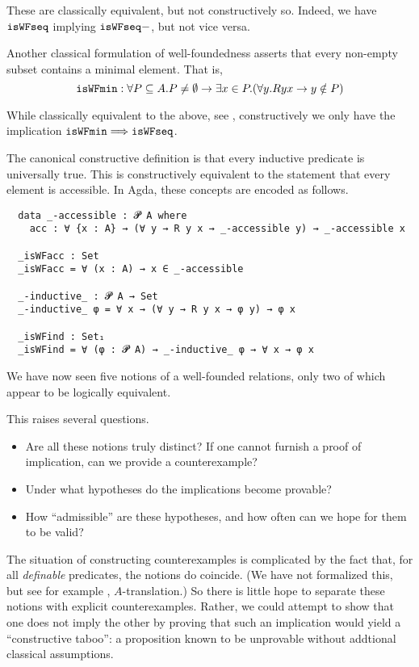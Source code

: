 These are classically equivalent, but not constructively so.
Indeed, we have $\mathtt{isWFseq}$ implying $\mathtt{isWFseq-}$, but not vice versa.

Another classical formulation of well-foundedness
asserts that every non-empty subset
contains a minimal element.  That is,
\[ \mathtt{isWFmin} : \forall P \subseteq A. P \neq \emptyset \to \exists x \in P. (\forall y. Ryx \to y\notin P) \]

While classically equivalent to the above, see  \cite{Terese, Exercise 1.11?},
constructively we only have the implication $\mathtt{isWFmin} \Longrightarrow \mathtt{isWFseq}$.

The canonical constructive definition is that
every inductive predicate is universally true.
This is constructively equivalent to the statement that every element
is accessible.  In Agda, these concepts are encoded as follows.
{\small
\begin{verbatim}
  data _-accessible : 𝓟 A where
    acc : ∀ {x : A} → (∀ y → R y x → _-accessible y) → _-accessible x

  _isWFacc : Set
  _isWFacc = ∀ (x : A) → x ∈ _-accessible

  _-inductive_ : 𝓟 A → Set
  _-inductive_ φ = ∀ x → (∀ y → R y x → φ y) → φ x

  _isWFind : Set₁
  _isWFind = ∀ (φ : 𝓟 A) → _-inductive_ φ → ∀ x → φ x
\end{verbatim}
}


We have now seen five notions of a well-founded relations, only two of which
appear to be logically equivalent.

This raises several questions.
\begin{itemize}
\item Are all these notions truly distinct?  If one cannot furnish a proof of implication,
can we provide a counterexample?
\item Under what hypotheses do the implications become provable?
\item How ``admissible'' are these hypotheses, and how often can we hope for them to be valid?
\end{itemize}

The situation of constructing counterexamples is complicated by the fact that, for all
\emph{definable} predicates, the notions do coincide.  (We have not formalized this,
but see for example \cite{Berardi}, $A$-translation.)
So there is little hope to separate these notions with explicit counterexamples.
Rather, we could attempt to show that one does not imply the other by proving that
such an implication would yield a ``constructive taboo'': a proposition known to be
unprovable without addtional classical assumptions.

